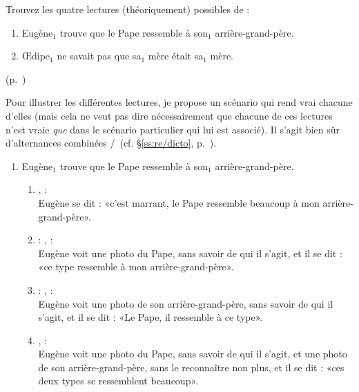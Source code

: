 \begin{exo}\label{exo:derededicto}
Trouvez les quatre lectures (théoriquement) possibles de :

\begin{enumerate}
\item Eugène$_1$ trouve que le Pape ressemble à son$_1$ arrière-grand-père.
\item \OE dipe$_1$ ne {savait} pas que {sa$_1$ mère} était {sa$_1$ mère}.
\end{enumerate}

\begin{solu}(p.~\pageref{exo:derededicto})\label{crg:derededicto} 

Pour illustrer les différentes lectures, je propose un scénario qui rend vrai chacune d'elles (mais cela ne veut pas dire nécessairement que chacune de ces lectures n'est vraie \emph{que} dans le scénario particulier qui lui est associé).  Il s'agit bien sûr d'alternances combinées \dedicto/\dere\ (cf. \S\ref{ss:re/dicto}, p.~\pageref{p.re/dicto}).

\begin{enumerate}
\item Eugène$_1$ trouve que le Pape ressemble à son$_1$ arrière-grand-père.
  \begin{enumerate}
  \item {},  : \dedicto\\
  Eugène se dit : «c'est marrant, le Pape ressemble beaucoup à mon arrière-grand-père».
  \item {} : \dere,  : \dedicto\\
  Eugène voit une photo du Pape, sans savoir de qui il s'agit, et il se dit : «ce type ressemble à mon arrière-grand-père».
  \item {} : \dedicto,  : \dere\\
  Eugène voit une photo de son arrière-grand-père, sans savoir de qui il s'agit, et il se dit : «Le Pape, il ressemble à ce type».
  \item {},  : \dere\\
  Eugène voit une photo du Pape, sans savoir de qui il s'agit, et une photo de son arrière-grand-père, sans le reconnaître non plus, et il se dit : «ces deux types se ressemblent beaucoup».
  \end{enumerate}


\end{enumerate}
\end{solu}
\end{exo}
